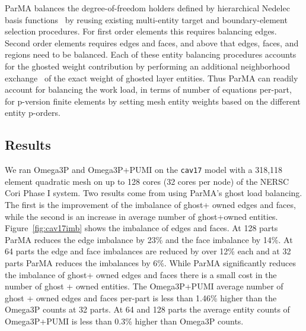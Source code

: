 \documentclass[review,12pt]{elsarticle_summary_report}
\begin{document}
ParMA balances the degree-of-freedom holders defined by 
hierarchical Nedelec basis functions~\cite{ingelstrom2006new,ko2010advances} by
reusing existing multi-entity target and boundary-element selection
procedures.
For first order elements this requires balancing edges.
Second order elements requires edges and faces, and above that edges, faces, and
regions need to be balanced. 
Each of these entity balancing procedures accounts for the ghosted weight
contribution by performing an additional neighborhood
exchange~\cite{ibanez2014hybrid} of the exact weight of ghosted layer entities.
Thus ParMA can readily account for balancing the work load, in terms of number
of equations per-part, for p-version finite elements by setting mesh entity
weights based on the different entity p-orders. 

\subsection{\label{load_balance_results} Results}

We ran Omega3P and Omega3P+PUMI on the \texttt{cav17} model with a 318,118
element quadratic mesh on up to 128 cores (32 cores per node) of the NERSC Cori
Phase I system. Two results come from using ParMA's ghost load balancing. The first 
is the improvement of the imbalance of ghost+ owned edges and faces, while the second 
is an increase in average number of ghost+owned entities.
Figure~\ref{fig:cav17imb} shows the imbalance of edges and faces.
At 128 parts ParMA reduces the edge imbalance by 23\%  and the face
imbalance by 14\%.
At 64 parts the edge and face imbalances are reduced by over 12\% each and
at 32 parts ParMA reduces the imbalances by 6\%.
While ParMA significantly reduces the imbalance of ghost+ owned edges and faces
there is a small cost in the number of ghost + owned entities.
The Omega3P+PUMI average number of ghost + owned edges and faces per-part
is less than 1.46\% higher than the Omega3P counts at 32 parts.
At 64 and 128 parts the average entity counts of Omega3P+PUMI is less than 0.3\%
higher than Omega3P counts.
\end{document}
